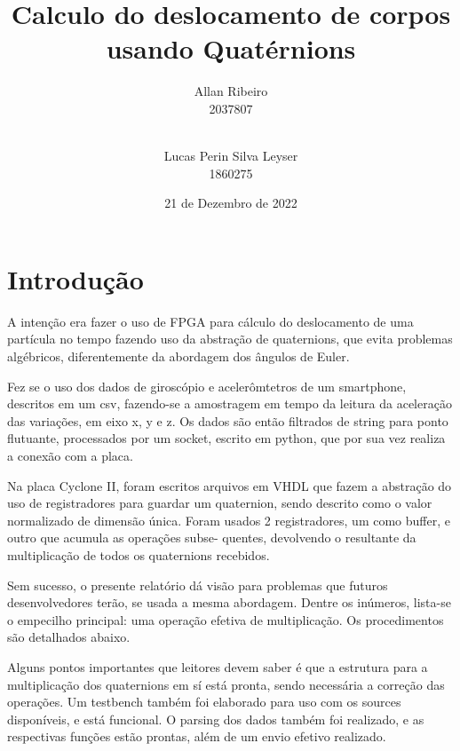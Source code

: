 \documentclass [12pt,oneside] {article}
\begin{document}

\title {Calculo do deslocamento de corpos usando Quatérnions}

\author {
	Allan Ribeiro\\
	2037807\\
	\and\\
	Lucas Perin Silva Leyser\\
	1860275
}

\date {21 de Dezembro de 2022}

\maketitle



\section{Introdução}


	A intenção era fazer o uso de FPGA para cálculo do
deslocamento de uma partícula no tempo fazendo uso da abstração de
quaternions, que evita problemas algébricos, diferentemente da
abordagem dos ângulos de Euler.

	Fez se o uso dos dados de giroscópio e acelerômtetros de um
smartphone, descritos em um csv, fazendo-se a amostragem em tempo da
leitura da aceleração das variações, em eixo x, y e z. Os dados são
então filtrados de string para ponto flutuante, processados por um
socket, escrito em python, que por sua vez realiza a conexão com a
placa.

	Na placa Cyclone II, foram escritos arquivos em VHDL que fazem
a abstração do uso de registradores para guardar um quaternion, sendo
descrito como o valor normalizado de dimensão única. Foram usados 2
registradores, um como buffer, e outro que acumula as operações subse-
quentes, devolvendo o resultante da multiplicação de todos os
quaternions recebidos.

	Sem sucesso, o presente relatório dá visão para problemas que
futuros desenvolvedores terão, se usada a mesma abordagem. Dentre os
inúmeros, lista-se o empecilho principal: uma operação efetiva de
multiplicação. Os procedimentos são detalhados abaixo.

	Alguns pontos importantes que leitores devem saber é que a
estrutura para a multiplicação dos quaternions em sí está pronta,
sendo necessária a correção das operações. Um testbench também foi
elaborado para uso com os sources disponíveis, e está funcional. O
parsing dos dados também foi realizado, e as respectivas funções estão
prontas, além de um envio efetivo realizado.
\end{document}
